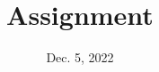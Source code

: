 \documentclass[onecolumn, oneside, ctexart]{SUSTechHomework}
\title{Assignment}
\date{Dec. 5, 2022}
\begin{document}
\maketitle
\toc

\end{document}
